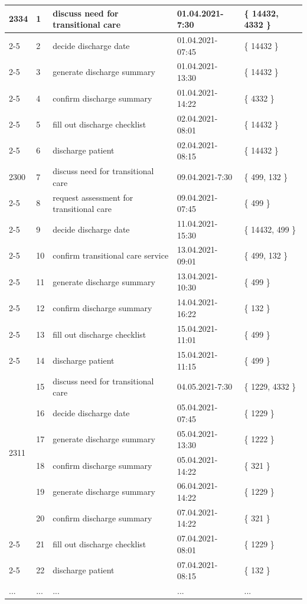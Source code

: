 \begin{longtable}{|l|l|l|l|l|}
\hline
 \multirow{6}{*}{2334} 
     & 1  & discuss need for transitional care & 01.04.2021-7:30  & \{ 14432, 4332 \} \\ \cline{2-5}
     & 2  & decide discharge date              & 01.04.2021-07:45 & \{ 14432 \} \\ \cline{2-5}
     & 3  & generate discharge summary         & 01.04.2021-13:30 & \{ 14432 \} \\ \cline{2-5}
     & 4  & confirm discharge summary          & 01.04.2021-14:22 & \{ 4332 \} \\ \cline{2-5}
     & 5  & fill out discharge checklist       & 02.04.2021-08:01 & \{ 14432 \} \\ \cline{2-5}
     & 6  & discharge patient                  & 02.04.2021-08:15 & \{ 14432 \} \\ \hline
 \multirow{1}{*}{2300} 
     & 7  & discuss need for transitional care        & 09.04.2021-7:30  & \{ 499, 132 \} \\ \cline{2-5}
     & 8  & request assessment for transitional care  & 09.04.2021-07:45 & \{ 499 \} \\ \cline{2-5}
     & 9  & decide discharge date                    & 11.04.2021-15:30 & \{ 14432, 499 \} \\ \cline{2-5}
     & 10 & confirm transitional care service         & 13.04.2021-09:01 & \{ 499, 132 \} \\ \cline{2-5}
     & 11 & generate discharge summary                & 13.04.2021-10:30 & \{ 499 \} \\ \cline{2-5}
     & 12 & confirm discharge summary                 & 14.04.2021-16:22 & \{ 132 \} \\ \cline{2-5}
     & 13 & fill out discharge checklist              & 15.04.2021-11:01 & \{ 499 \} \\ \cline{2-5}
     & 14 & discharge patient                         & 15.04.2021-11:15 & \{ 499 \} \\ \hline
 \multirow{6}{*}{2311} 
     & 15 & discuss need for transitional care & 04.05.2021-7:30  & \{ 1229, 4332 \} \\ \cline{2-5}
     & 16 & decide discharge date              & 05.04.2021-07:45 & \{ 1229 \} \\ \cline{2-5}
     & 17 & generate discharge summary         & 05.04.2021-13:30 & \{ 1222 \} \\ \cline{2-5}
     & 18 & confirm discharge summary          & 05.04.2021-14:22 & \{ 321 \} \\ \cline{2-5}
     & 19 & generate discharge summary         & 06.04.2021-14:22 & \{ 1229 \} \\ \cline{2-5}
     & 20 & confirm discharge summary          & 07.04.2021-14:22 & \{ 321 \} \\ \cline{2-5}
     & 21 & fill out discharge checklist       & 07.04.2021-08:01 & \{ 1229 \} \\ \cline{2-5}
     & 22 & discharge patient                  & 07.04.2021-08:15 & \{ 132 \} \\ \hline
 ... & ... & ... & ... & ...
\end{longtable}
\normalsize